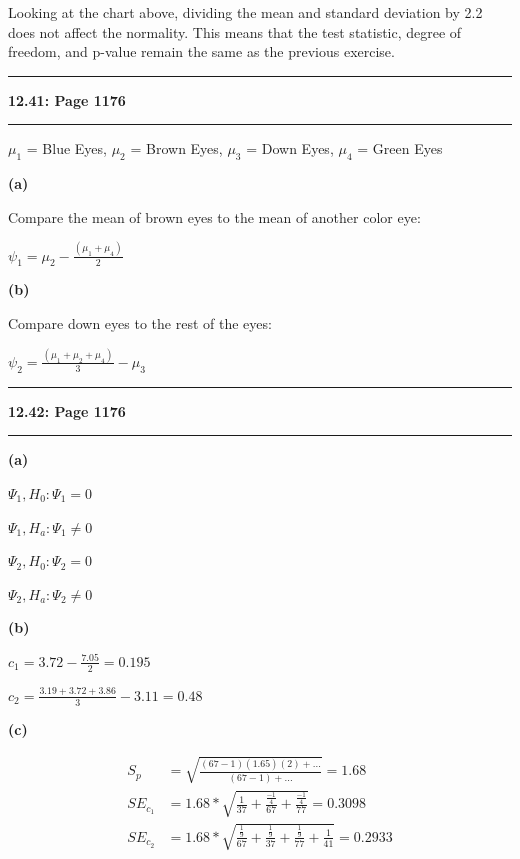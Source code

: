 \documentclass[11pt]{article}
\newcommand\question[2]{\vspace{.25in}\hrule\textbf{#1: #2}\vspace{.5em}\hrule\vspace{.10in}}
\renewcommand\part[1]{\vspace{.10in}\textbf{(#1)}\par}
\begin{document}
    Looking at the chart above, dividing the mean and standard deviation by 2.2 does not
    affect the normality. This means that the test statistic, degree of freedom, and p-value
    remain the same as the previous exercise. \par


\question{12.41}{Page 1176}
    $\mu_{1}$ = Blue Eyes,
    $\mu_{2}$ = Brown Eyes,
		$\mu_{3}$ = Down Eyes,
		$\mu_{4}$ = Green Eyes\par
	\part{a}
		Compare the mean of brown eyes to the mean of another color eye:\par
		$\psi_{1}=\mu_{2} - \frac{(\mu_{1} + \mu_{4})}{2}$\par
	
	\part{b}
		Compare down eyes to the rest of the eyes:\par
		$\psi_{2} = \frac{(\mu_{1} + \mu_{2} + \mu_{4})}{3}-\mu_{3}$


\question{12.42}{Page 1176}
	\part{a}
		$\Psi_{1}, H_{0}: \Psi_{1} = 0$\par
		$\Psi_{1}, H_{a}: \Psi_{1} \ne 0$\par
		$\Psi_{2}, H_{0}: \Psi_{2} = 0$\par
		$\Psi_{2}, H_{a}: \Psi_{2} \ne 0$\par
	
	\part{b}
		$c_{1} = 3.72 - \frac{7.05}{2} = 0.195$\par
		$c_{2} = \frac{3.19 + 3.72 + 3.86}{3} - 3.11= 0.48$\par	
	
	\part{c}
		\begin{align*}
			S_{p} &= \sqrt{ \frac{ (67-1)(1.65)(2) + ... }{ (67-1) + ... } } = 1.68\\
			SE_{c_{1}} &= 1.68 * \sqrt{\frac{1}{37}+ \frac{\frac{-1}{4}}{67} + \frac{\frac{-1}{4}}{77}} = 0.3098\\
			SE_{c_{2}} &= 1.68 * \sqrt{  \frac{\frac{1}{9}}{67} + \frac{\frac{1}{9}}{37} + \frac{\frac{1}{9}}{77} + \frac{1}{41}} = 0.2933\\
		\end{align*}\par
	
\end{document}
